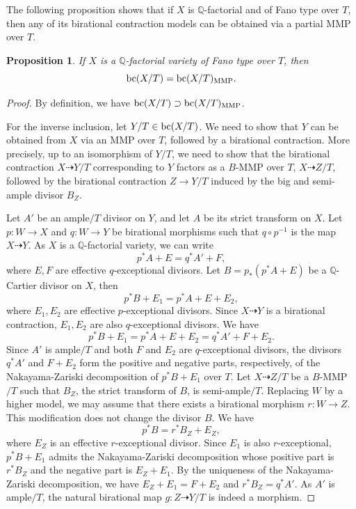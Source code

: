 \documentclass[11pt,oneside,reqno]{amsart}
\numberwithin{equation}{section}
\newtheorem{proposition}{Proposition}[section]
\theoremstyle{definition}
\newcommand{\bc}{{\rm {bc}}}
\newcommand{\dto}{\dashrightarrow}
\newcommand{\bQ}{\mathbb{Q}}
\begin{document}
    The following proposition shows that if $X$ is $\bQ$-factorial and of Fano type over $T$, then any of its birational contraction models can be obtained via a partial MMP over $T$.

\begin{proposition}\label{prop: bc=bcmmp}
If $X$ is a $\mathbb{Q}$-factorial variety of Fano type over $T$, then
\[
\bc(X/T)=\bc(X/T)_{\rm MMP}.
\]
\end{proposition}
\begin{proof}
By definition, we have $\bc(X/T)\supset\bc(X/T)_{\rm MMP}$.

For the inverse inclusion, let $Y/T \in \bc(X/T)$. We need to show that $Y$ can be obtained from $X$ via an MMP over $T$, followed by a birational contraction. More precisely, up to an isomorphism of $Y/T$, we need to show that the birational contraction $X \dto Y/T$ corresponding to $Y$ factors as a $B$-MMP over $T$, $X \dto Z/T$, followed by the birational contraction $Z \to Y/T$ induced by the big and semi-ample divisor $B_Z$.
    
    Let $A'$ be an ample$/T$ divisor on $Y$, and let $A$ be its strict transform on $X$. Let $p: W \to X$ and $q: W \to Y$ be birational morphisms such that $q\circ p^{-1}$ is the map $X \dto Y$. As $X$ is a $\bQ$-factorial variety, we can write
    \[
    p^*A+E=q^*A'+F,
    \] where $E, F$ are effective $q$-exceptional divisors. Let $B=p_*(p^*A+E)$ be a $\bQ$-Cartier divisor on $X$, then 
    \[
    p^*B+E_1=p^*A+E+E_2,
    \] where $E_1, E_2$ are effective $p$-exceptional divisors. Since $X \dto Y$ is a birational contraction, $E_1, E_2$ are also $q$-exceptional divisors. We have
    \[
    p^*B+E_1=p^*A+E+E_2=q^*A'+F+E_2.
    \] Since $A'$ is ample$/T$ and both $F$ and $E_2$ are $q$-exceptional divisors, the divisors $q^*A'$ and $F + E_2$ form the positive and negative parts, respectively, of the Nakayama-Zariski decomposition of $p^*B + E_1$ over $T$. Let $X \dto Z/T$ be a $B$-MMP$/T$ such that $B_Z$, the strict transform of $B$, is semi-ample$/T$. Replacing $W$ by a higher model, we may assume that there exists a birational morphism $r: W \to Z$. This modification does not change the divisor $B$. We have
    \[
    p^*B = r^*B_Z+E_Z,
    \] where $E_Z$ is an effective $r$-exceptional divisor. Since $E_1$ is also $r$-exceptional, $p^*B+E_1$ admits the Nakayama-Zariski decomposition whose positive part is $r^*B_Z$ and the negative part is $E_Z+E_1$. By the uniqueness of the Nakayama-Zariski decomposition, we have $E_Z+E_1=F+E_2$ and $r^*B_Z=q^*A'$. As $A'$ is ample$/T$, the natural birational map $g: Z \dto Y/T$ is indeed a morphism.
\end{proof}
\end{document}
